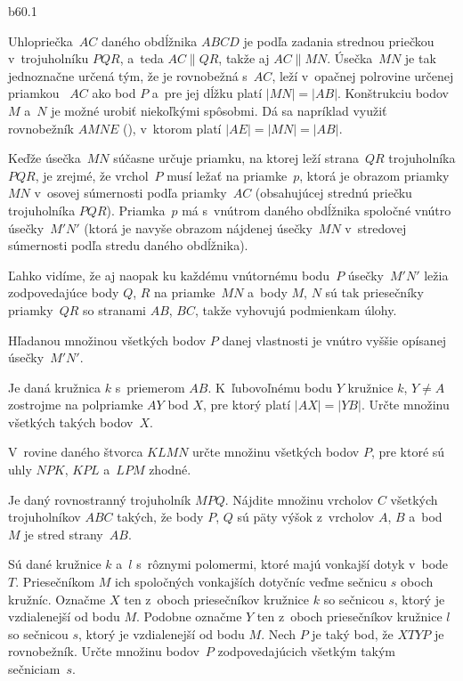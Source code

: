 {%
\epsplace b60.1 \hfil\Obr\par
Uhlopriečka~$AC$ daného obdĺžnika $ABCD$ je podľa zadania strednou priečkou
v~trojuholníku
$PQR$, a~teda $AC\parallel QR$, takže aj $AC\parallel MN$. Úsečka~$MN$
je tak jednoznačne
\inspicture%
určená tým, že je rovnobežná s~$AC$, leží v~opačnej polrovine určenej priamkou~
$AC$ ako bod $P$ a~pre jej dĺžku platí $|MN|=|AB|$.
Konštrukciu bodov $M$ a~$N$ je možné urobiť
niekoľkými spôsobmi. Dá sa napríklad využiť rovnobežník $AMNE$
(\obr), v~ktorom platí $|AE|=|MN|=|AB|$.

Keďže úsečka~$MN$ súčasne určuje priamku, na ktorej leží strana~$QR$ trojuholníka $PQR$,
je zrejmé, že vrchol~$P$ musí ležať na priamke~$p$, ktorá je obrazom priamky~$MN$ v~osovej
súmernosti podľa priamky~$AC$ (obsahujúcej strednú priečku trojuholníka $PQR$).
Priamka~$p$ má s~vnútrom daného obdĺžnika
spoločné vnútro úsečky~$M'N'$ (ktorá je navyše obrazom nájdenej úsečky~$MN$
v~stredovej súmernosti podľa stredu daného obdĺžnika).

Ľahko vidíme, že aj naopak ku každému vnútornému bodu~$P$ úsečky~$M'N'$ ležia
zodpovedajúce body $Q$, $R$ na priamke~$MN$ a~body $M$, $N$ sú tak priesečníky priamky~$QR$
so stranami $AB$, $BC$, takže vyhovujú podmienkam úlohy.

\zaver
Hľadanou množinou všetkých bodov $P$ danej vlastnosti je vnútro vyššie
opísanej úsečky~$M'N'$.

Je daná kružnica $k$ s~priemerom $AB$. K~ľubovoľnému bodu $Y$ kružnice
$k$, $Y\ne A$ zostrojme na polpriamke
$AY$ bod $X$, pre ktorý platí $|AX|=|YB|$.
Určte množinu všetkých takých bodov~$X$.
\vpravo{[56--B--I--2]}

V~rovine daného štvorca $KLMN$ určte množinu všetkých bodov $P$, pre ktoré
sú uhly $NPK$, $KPL$ a~$LPM$ zhodné.
\vpravo{[53--A--I--2]}

Je daný rovnostranný trojuholník $MPQ$. Nájdite množinu vrcholov $C$ všetkých
trojuholníkov $ABC$ takých, že
body $P$, $Q$ sú päty výšok z~vrcholov $A$, $B$ a~bod $M$ je stred strany~$AB$.
\vpravo{[51--B--I--6]}

Sú dané kružnice $k$ a~$l$ s~rôznymi polomermi, ktoré majú vonkajší dotyk
v~bode $T$. Priesečníkom $M$ ich
spoločných vonkajších dotyčníc veďme sečnicu $s$ oboch kružníc. Označme $X$ ten
z~oboch priesečníkov kružnice $k$ so sečnicou
$s$, ktorý je vzdialenejší od bodu $M$. Podobne označme $Y$ ten z~oboch
priesečníkov kružnice $l$ so sečnicou $s$, ktorý
je vzdialenejší od bodu $M$. Nech $P$ je taký bod, že $XTYP$ je
rovnobežník. Určte množinu bodov~$P$ zodpovedajúcich
všetkým takým sečniciam~$s$.
\vpravo{[49--B--I--4]}
}

